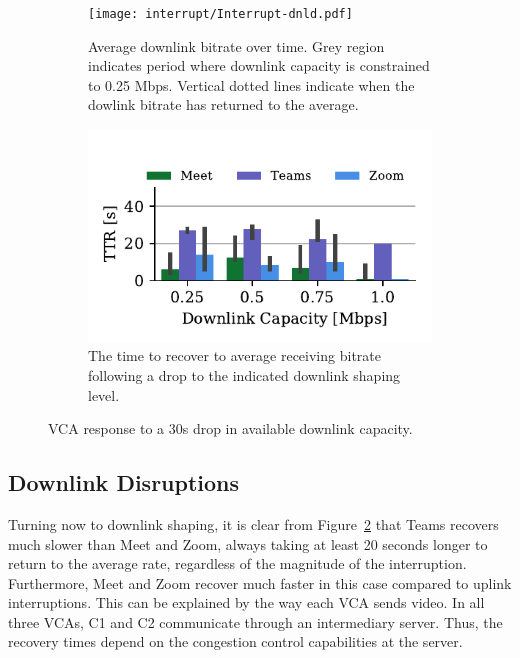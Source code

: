 \begin{figure}[t!]
 \centering
\begin{subfigure}[t]{.5\textwidth}
   \centering
    \texttt{[image: interrupt/Interrupt-dnld.pdf]}
    \caption{Average downlink bitrate over time. Grey region indicates period where downlink capacity is constrained to 0.25 Mbps. Vertical dotted lines indicate when the dowlink bitrate has returned to the average.}
    \label{fig:ts-dnld}
\end{subfigure}
\begin{subfigure}[t]{.5\textwidth}
  \centering
    \includegraphics[width=.9\textwidth,keepaspectratio]{figures/interrupt/TTR-dnld.pdf}
    \caption{The time to recover to average receiving bitrate following a drop to the indicated downlink shaping level.}
    \label{fig:TTR_dnld}
\end{subfigure}
\caption{VCA response to a 30s drop in available downlink capacity.}
\label{fig:interrupt-dnld}
\end{figure}

\subsection{Downlink Disruptions}

Turning now to downlink shaping, it is clear from Figure~\ref{fig:TTR_dnld} that Teams recovers much slower than Meet and Zoom, always taking at least 20 seconds longer to return to the average rate, regardless of the magnitude of the interruption. Furthermore, Meet and Zoom recover much faster in this case compared to uplink interruptions. This can be explained by the way each VCA sends video. In all three VCAs, C1 and C2 communicate through an intermediary server. Thus, the recovery times depend on the congestion control capabilities at the server. 


